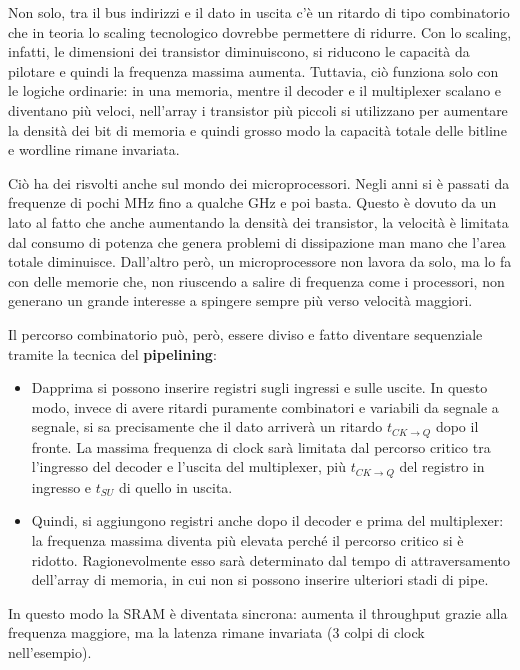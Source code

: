 \documentclass[11pt,4paper]{report}
\begin{document}
Non solo, tra il bus indirizzi e il dato in uscita c'è un ritardo di tipo combinatorio che in teoria lo scaling tecnologico dovrebbe permettere di ridurre. Con lo scaling, infatti, le dimensioni dei transistor diminuiscono, si riducono le capacità da pilotare e quindi la frequenza massima aumenta. Tuttavia, ciò funziona solo con le logiche ordinarie: in una memoria, mentre il decoder e il multiplexer scalano e diventano più veloci, nell'array i transistor più piccoli si utilizzano per aumentare la densità dei bit di memoria e quindi grosso modo la capacità totale delle bitline e wordline rimane invariata. 

Ciò ha dei risvolti anche sul mondo dei microprocessori. Negli anni si è passati da frequenze di pochi \si{\mega\hertz} fino a qualche \si{\giga\hertz} e poi basta. Questo è dovuto da un lato al fatto che anche aumentando la densità dei transistor, la velocità è limitata dal consumo di potenza che genera problemi di dissipazione man mano che l'area totale diminuisce. Dall'altro però, un microprocessore non lavora da solo, ma lo fa con delle memorie che, non riuscendo a salire di frequenza come i processori, non generano un grande interesse a spingere sempre più verso velocità maggiori.

Il percorso combinatorio può, però, essere diviso e fatto diventare sequenziale tramite la tecnica del \textbf{pipelining}: 
\begin{itemize}
	\item Dapprima si possono inserire registri sugli ingressi e sulle uscite. In questo modo, invece di avere ritardi puramente combinatori e variabili da segnale a segnale, si sa precisamente che il dato arriverà un ritardo $t_{CK \to Q}$ dopo il fronte. La massima frequenza di clock sarà limitata dal percorso critico tra l'ingresso del decoder e l'uscita del multiplexer, più  $t_{CK \to Q}$ del registro in ingresso e  $t_{SU}$ di quello in uscita.
	\item Quindi, si aggiungono registri anche dopo il decoder e prima del multiplexer: la frequenza massima diventa più elevata perché il percorso critico si è ridotto. Ragionevolmente esso sarà determinato dal tempo di attraversamento dell'array di memoria, in cui non si possono inserire ulteriori stadi di pipe.
\end{itemize}
In questo modo la SRAM è diventata sincrona: aumenta il throughput grazie alla frequenza maggiore, ma la latenza rimane invariata (3 colpi di clock nell'esempio). 
\end{document}
